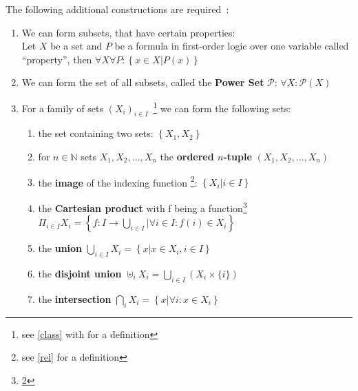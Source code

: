             The following additional constructions are required~\autocite{CT1}:
            \begin{definition}[Set]
                \begin{enumerate}
                 \item We can form subsets, that have certain properties: \\
                 Let $X$ be a set and $P$ be a formula in first-order logic over one variable called "`property"', then $\forall X \forall P: \left\{ x \in X | P(x) \right\} $
                 
                 \item We can form the set of all subsets, called the \textbf{Power Set} $\mathcal{P}$: $\forall X: \mathcal{P}(X)$
                

                \item For a family of sets $\left( X_i\right)_{i \in I}$~\footnote{see \ref{class} with for a definition} we can form the following sets:
                    \begin{enumerate}
                     \item the set containing two sets: $\left\{ X_1, X_2 \right\}$
                     
                     \item for $n \in \mathbb{N}$ sets $X_1, X_2, \dots, X_n$ the \textbf{ordered $n$-tuple} $(X_1, X_2, \dots, X_n)$
                     
                     \item the \textbf{image} of the indexing function \footnote{\label{note1}see \ref{rel} for a definition}: $\left\{ X_i | i \in I \right\}$
                     
                      \item the \textbf{Cartesian product} with f being a function\footnote{\ref{note1}} $\Pi_{i \in I} X_i = \left\{ f: I \rightarrow \bigcup_{i \in I} | \forall i \in I: f(i) \in X_i \right\}$
                      
                      \item the \textbf{union} $\bigcup_{i \in I} X_i = \left\{ x | x \in X_i, i \in I \right\}$
                     
                     \item the \textbf{disjoint union} $\uplus_i X_i = \bigcup_{i \in I} \left( X_i \times \{ i \} \right)$
                     
                     \item the \textbf{intersection} $\bigcap_i X_i = \left\{ x | \forall i: x \in X_i \right\}$
                     

\end{enumerate}
\end{enumerate}
\end{definition}
